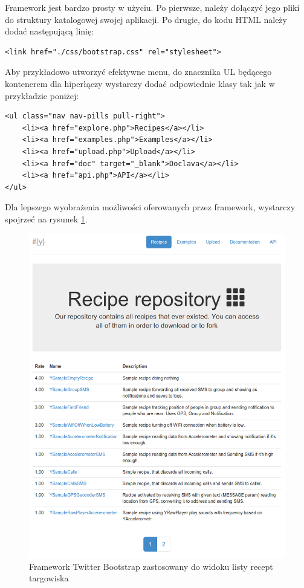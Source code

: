 \documentclass[11pt,a4paper,polish,thesis]{dcsbook}
\begin{document}
Framework jest bardzo prosty w użyciu. Po pierwsze, należy dołączyć jego pliki do struktury katalogowej swojej aplikacji. Po drugie, do kodu HTML należy dodać
następującą linię:
\begin{verbatim}
<link href="./css/bootstrap.css" rel="stylesheet">
\end{verbatim}

Aby przykładowo utworzyć efektywne menu, do znacznika UL będącego kontenerem dla hiperłączy wystarczy dodać odpowiednie klasy tak jak w przykładzie poniżej:
\begin{verbatim}
<ul class="nav nav-pills pull-right">
	<li><a href="explore.php">Recipes</a></li>
	<li><a href="examples.php">Examples</a></li>
	<li><a href="upload.php">Upload</a></li>
	<li><a href="doc" target="_blank">Doclava</a></li>
	<li><a href="api.php">API</a></li>
</ul>
\end{verbatim}

Dla lepszego wyobrażenia możliwości oferowanych przez framework, wystarczy spojrzeć na rysunek \ref{fig:market}.
\begin{figure}[p]
  \centering
  \includegraphics[scale=0.5]{./resources/market.png}
  \caption{Framework Twitter Bootstrap zastosowany do widoku listy recept targowiska}
  \label{fig:market}
\end{figure}
\end{document}
